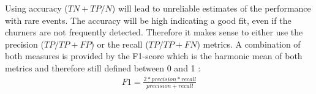 \documentclass[12pt,titlepage]{article}
\begin{document}
Using accuracy ($TN+TP/N$) will lead to unreliable estimates of the performance with rare events. The accuracy will be high indicating a good fit, even if the churners are not frequently detected. Therefore it makes sense to either use the precision ($TP/TP+FP$) or the recall ($TP/TP+FN$) metrics. A combination of both measures is provided by the F1-score which is the harmonic mean of both metrics and therefore still defined between 0 and 1 \cite{mining_rarity}: \\

\begin{equation} \label{f1}
    \begin{aligned}
        F1 = \frac{2*precision*recall}{precision+recall} \\
    \end{aligned}
\end{equation}
\end{document}
